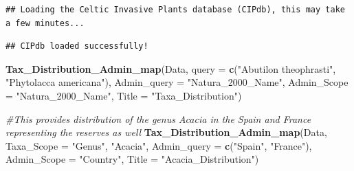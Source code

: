 \documentclass[
]{article}
\newenvironment{Shaded}{\begin{snugshade}}{\end{snugshade}}
\newcommand{\AttributeTok}[1]{\textcolor[rgb]{0.13,0.29,0.53}{#1}}
\newcommand{\CommentTok}[1]{\textcolor[rgb]{0.56,0.35,0.01}{\textit{#1}}}
\newcommand{\FunctionTok}[1]{\textcolor[rgb]{0.13,0.29,0.53}{\textbf{#1}}}
\newcommand{\NormalTok}[1]{#1}
\newcommand{\StringTok}[1]{\textcolor[rgb]{0.31,0.60,0.02}{#1}}
\begin{document}
\begin{verbatim}
## Loading the Celtic Invasive Plants database (CIPdb), this may take a few minutes...
\end{verbatim}

\begin{verbatim}
## CIPdb loaded successfully!
\end{verbatim}

\begin{Shaded}
\begin{Highlighting}[]
\FunctionTok{Tax\_Distribution\_Admin\_map}\NormalTok{(Data, }\AttributeTok{query =} \FunctionTok{c}\NormalTok{(}\StringTok{"Abutilon theophrasti"}\NormalTok{, }\StringTok{"Phytolacca americana"}\NormalTok{), }\AttributeTok{Admin\_query =} \StringTok{"Natura\_2000\_Name"}\NormalTok{, }\AttributeTok{Admin\_Scope =} \StringTok{"Natura\_2000\_Name"}\NormalTok{, }\AttributeTok{Title =} \StringTok{"Taxa\_Distribution"}\NormalTok{)}

\CommentTok{\#This provides distribution of the genus Acacia in the Spain and France representing the reserves as well}
\FunctionTok{Tax\_Distribution\_Admin\_map}\NormalTok{(Data, }\AttributeTok{Taxa\_Scope =} \StringTok{"Genus"}\NormalTok{, }\StringTok{"Acacia"}\NormalTok{, }\AttributeTok{Admin\_query =} \FunctionTok{c}\NormalTok{(}\StringTok{"Spain"}\NormalTok{, }\StringTok{"France"}\NormalTok{), }\AttributeTok{Admin\_Scope =} \StringTok{"Country"}\NormalTok{, }\AttributeTok{Title =} \StringTok{"Acacia\_Distribution"}\NormalTok{)}
\end{Highlighting}
\end{Shaded}
\end{document}
